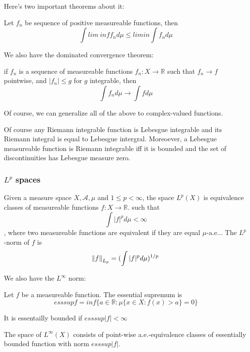 \documentclass[main.tex]{subfiles}
\begin{document}
Here's two important theorems about it:

\begin{theorem}
Let $f_n$ be sequence of positive measureable functions, then 
$$
\int lim\ inf f_n d\mu \leq lim in \int f_n d\mu
$$
\end{theorem}


We also have the dominated convergence theorem:
\begin{theorem}
if $f_n$ is a sequence of measureable functions $f_n: X \rightarrow \mathbb{R}$ such that $f_n \rightarrow f$ pointwise, and $|f_n| \leq g$ for $g$ integrable, then
$$
\int f_n d\mu \rightarrow \int f d\mu 
$$
\end{theorem}

Of course, we can generalize all of the above to complex-valued functions.

\begin{theorem}
Of course any Riemann integrable function is Lebesgue integrable and its Riemann integral is equal to Lebesgue intergral. Moreoever, a Lebesgue measureable function is Riemann integrable iff it is bounded and the set of discontinuities has Lebesgue measure zero.
\end{theorem}

\subsubsection{$L^p$ spaces}

\begin{definition}
Given a measure space $X, \mathcal{A}, \mu$ and $1 \leq p < \infty$, the space $L^p(X)$ is equivalence classes of measureable functions $f: X \rightarrow \mathbb{R}$. such that
$$
\int |f|^p d\mu < \infty
$$, 
where two measureable functions are equivalent if they are equal $\mu$-a.e... The $L^p$-norm of $f$ is 
$$
\norm{f}_{L_p} = (\int |f|^p d\mu )^{1/p}
$$

\end{definition}
We also have the $L^\infty$ norm:
\begin{definition}
Let $f$ be a measureable function. The essential supremum is 
$$
ess sup f = inf \{a \in \mathbb{R}: \mu \{x \in X : f(x) > a \} = 0 \}
$$

It is essentailly bounded if $ess sup|f| < \infty$

The space of $L^\infty(X)$ consists of point-wise a.e.-equivalence classes of essentially bounded function with norm $ess sup|f|$.
\end{definition}
\end{document}
